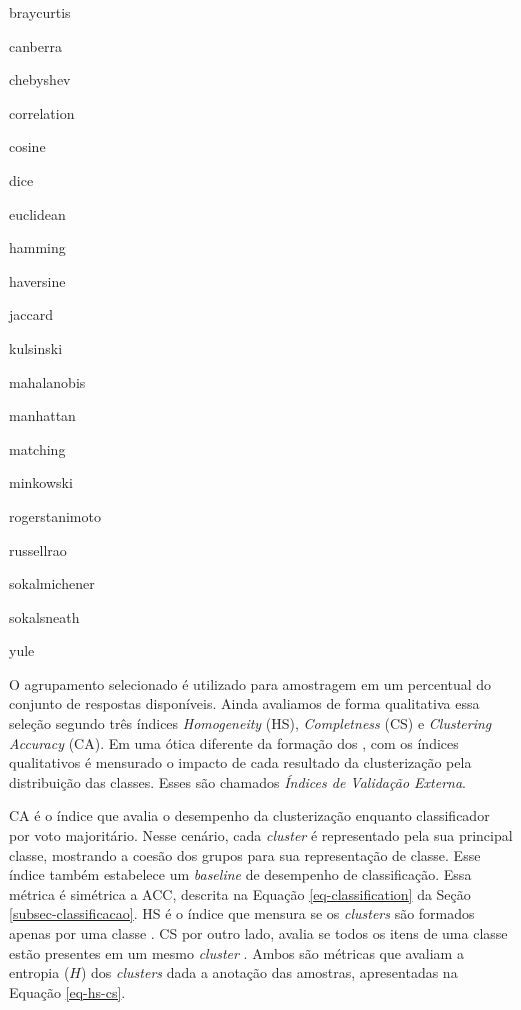 \begin{itemize}
\begin{multicols}{4}
  \item braycurtis
  \item canberra
  \item chebyshev
  \item correlation
  \item cosine
  \item dice
  \item euclidean
  \item hamming
  \item haversine
  \item jaccard
  \item kulsinski
  \item mahalanobis
  \item manhattan
  \item matching
  \item minkowski
  \item rogerstanimoto
  \item russellrao
  \item sokalmichener
  \item sokalsneath
  \item yule
  \end{multicols}
\end{itemize}

O agrupamento selecionado é utilizado para amostragem em um percentual do conjunto de respostas disponíveis. Ainda avaliamos de forma qualitativa essa seleção segundo três índices \textit{Homogeneity} (HS), \textit{Completness} (CS) e \textit{Clustering Accuracy} (CA). Em uma ótica diferente da formação dos , com os índices qualitativos é mensurado o impacto de cada resultado da clusterização pela distribuição das classes. Esses são chamados \textit{Índices de Validação Externa}.

CA é o índice que avalia o desempenho da clusterização enquanto classificador por voto majoritário. Nesse cenário, cada \textit{cluster} é representado pela sua principal classe, mostrando a coesão dos grupos para sua representação de classe. Esse índice também estabelece um \textit{baseline} de desempenho de classificação. Essa métrica é simétrica a ACC, descrita na Equação \ref{eq-classification} da Seção \ref{subsec-classificacao}. HS é o índice que mensura se os \textit{clusters} são formados apenas por uma classe \cite{rosenberg2007}. CS por outro lado, avalia se todos os itens de uma classe estão presentes em um mesmo \textit{cluster} \cite{rosenberg2007}. Ambos são métricas que avaliam a entropia ($H$) dos \textit{clusters} dada a anotação das amostras, apresentadas na Equação \ref{eq-hs-cs}.

